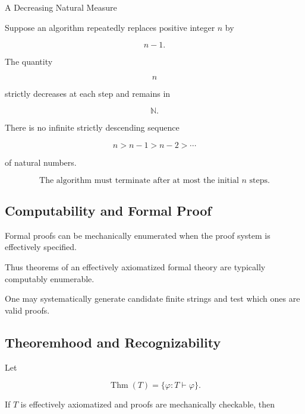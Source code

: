\begin{workedexamplebox}{A Decreasing Natural Measure}

Suppose an algorithm repeatedly replaces positive integer \(n\) by

\[
n-1.
\]

The quantity

\[
n
\]

strictly decreases at each step and remains in

\[
\mathbb{N}.
\]

There is no infinite strictly descending sequence

\[
n>n-1>n-2>\cdots
\]

of natural numbers.

\begin{answerbox}
\[
\boxed{
\text{The algorithm must terminate after at most the initial }n
\text{ steps}.
}
\]
\end{answerbox}

\end{workedexamplebox}

\subsection{Computability and Formal Proof}
\label{subsec:computability-formal-proof}

Formal proofs can be mechanically enumerated when the proof system is
effectively specified.

Thus theorems of an effectively axiomatized formal theory are typically
computably enumerable.

One may systematically generate candidate finite strings and test which
ones are valid proofs.

\subsection{Theoremhood and Recognizability}
\label{subsec:theoremhood-recognizability}

Let

\[
\operatorname{Thm}(T)
=
\{
\varphi:
T\vdash\varphi
\}.
\]

If \(T\) is effectively axiomatized and proofs are mechanically checkable,
then

